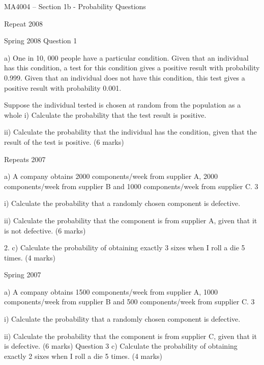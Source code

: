 \documentclass[12pt]{report}
\begin{document}
{{%

MA4004 – Section 1b - Probability Questions

Repeat 2008

Spring 2008
Question 1

a)   One in 10, 000 people have a particular condition. Given that an individual has this condition, a test for this condition gives a positive result with probability 0.999. Given that an individual does not have this condition, this test gives a positive result with probability 0.001.

Suppose the individual tested is chosen at random from the population as a whole
i)                  Calculate the probability that the test result is positive.

ii)                Calculate the probability that the individual has the condition, given that the result of the test is positive.
(6 marks)

Repeats 2007

a) A company obtains 2000 components/week from supplier A, 2000 components/week from supplier B and 1000 components/week from supplier C. 3%

i) Calculate the probability that a randomly chosen component is defective.

ii) Calculate the probability that the component is from supplier A, given that it is not defective.
(6 marks)

2.              c) Calculate the probability of obtaining exactly 3 sixes when I roll a die
5 times.
(4 marks)





Spring 2007

a) A company obtains 1500 components/week from supplier A, 1000 components/week from supplier B and 500 components/week from supplier C. 3%

i) Calculate the probability that a randomly chosen component is defective.

ii) Calculate the probability that the component is from supplier C, given that it is defective.
(6 marks)
Question 3
c) Calculate the probability of obtaining exactly 2 sixes when I roll a die 5 times.
(4 marks)

}}
\end{document}
